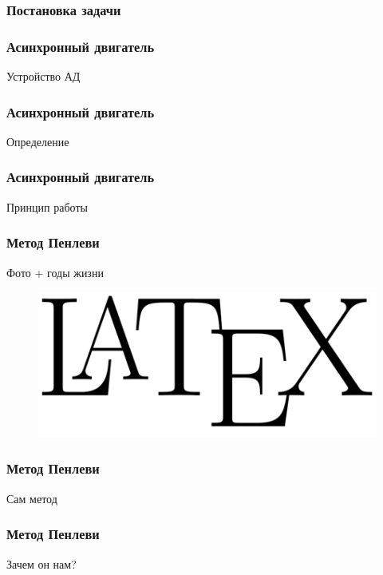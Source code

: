 \documentclass[14pt]{beamer}
\author{\small{%
Тема нашей презентации\\
\vspace{50pt}
\emph{Выступающиe:}~П. С. Анашкевич, Р. И. Будный\\%
\emph{Руководитель:}~проф.,~к.ф.-м.н.~В.В.Цегельник}\\%
\vspace{30pt}%
}
\date{\small{Минск, 2013}}
\begin{document}
\maketitle

\begin{frame}
\frametitle{Постановка задачи}



\end{frame}

\begin{frame}
\frametitle{Асинхронный двигатель}

Устройство АД

\end{frame}

\begin{frame}
\frametitle{Асинхронный двигатель}

Определение

\end{frame}


\begin{frame}
\frametitle{Асинхронный двигатель}

Принцип работы

\end{frame}


\begin{frame}
\frametitle{Метод Пенлеви}

Фото + годы жизни

\begin{figure}[H]
  \center
  \includegraphics[width=0.8\linewidth]{latex}
\end{figure}

\end{frame}

\begin{frame}

\frametitle{Метод Пенлеви}

Сам метод

\end{frame}

\begin{frame}

\frametitle{Метод Пенлеви}

Зачем он нам?

\end{frame}
\end{document}
